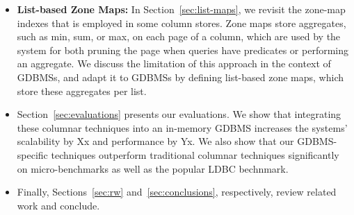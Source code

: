 \begin{itemize}
	\item {\bf List-based Zone Maps:} In Section~\ref{sec:list-maps}, we revisit the zone-map~\cite{} indexes that  is employed in some column stores. Zone maps store aggregates, such as min, sum, or max, on each page of a column, which are used by the system for both pruning the page when queries have predicates or performing an aggregate. We discuss the limitation of this approach in the context of GDBMSs, and adapt it to GDBMSs by defining list-based zone maps, which store these aggregates per list.
	
	\item Section~\ref{sec:evaluations} presents our evaluations. We show that integrating these columnar techniques into an in-memory GDBMS increases the systems' scalability by Xx and performance by Yx. We also show that our GDBMS-specific techniques outperform traditional columnar techniques significantly on micro-benchmarks as well as the popular LDBC bechnmark.
	
	\item Finally, Sections~\ref{sec:rw} and~\ref{sec:conclusions}, respectively, review related work and conclude.   
\end{itemize}
